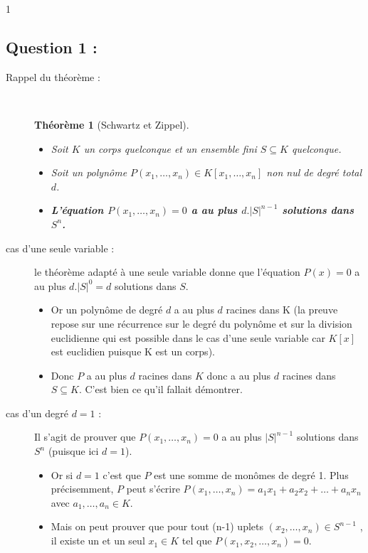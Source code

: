1\documentclass[a4paper, 11pt,french]{article}
\newtheorem*{theo}{Théorème}
\begin{document}
\subsection*{Question 1 :}
\begin{description}
\item[Rappel du théorème : ]
  \
  
  \begin{theo}[Schwartz et Zippel]
    \
    
    \begin{itemize}
    \item Soit $K$ un corps quelconque et un ensemble fini $S\subseteq K$ quelconque.
    \item Soit un polynôme $P(x_1,\ldots,x_n)\in K[x_1,\ldots,x_n]$ non nul de degré total $d$.
    \item \textbf{L'équation $P(x_1,\ldots,x_n)=0$ a au plus $d.|S|^{n-1}$ solutions dans $S^n$.}
    \end{itemize}
  \end{theo}

\item[cas d'une seule variable :]
  le théorème adapté à une seule variable donne que \og l'équation $P(x)=0$  a au plus $d.|S|^0=d$ solutions dans $S$.
  \begin{itemize}
  \item Or un polynôme de degré $d$ a au plus $d$ racines dans K (la preuve repose sur une récurrence sur le degré du polynôme et sur la division euclidienne qui est possible dans le cas d'une seule variable car $K[x]$ est euclidien puisque K est un corps).
  \item Donc $P$ a au plus $d$ racines dans $K$ donc a au plus $d$ racines dans $S\subseteq K$. C'est bien ce qu'il fallait démontrer.
  \end{itemize}
\item[cas d'un degré $d=1$ :] Il s'agit de prouver que $P(x_1,\ldots,x_n)=0$ a au plus $|S|^{n-1}$ solutions dans $S^n$ (puisque ici $d=1$).

  \begin{itemize}
  \item     Or si $d=1$ c'est que $P$ est une somme de monômes de degré 1. Plus précisemment, $P$ peut s'écrire $P(x_1,\ldots,x_n)=a_1x_1+a_2x_2+\ldots+a_nx_n$ avec $a_1,\ldots,a_n\in K$.
  \item    Mais on peut prouver que pour tout (n-1) uplets $(x_2,\ldots,x_n)\in S^{n-1}$ , il existe un et un seul $x_1\in K$ tel que $P(x_1,x_2,\ldots,x_n)=0$.
    

\end{itemize}
\end{description}
\end{document}
